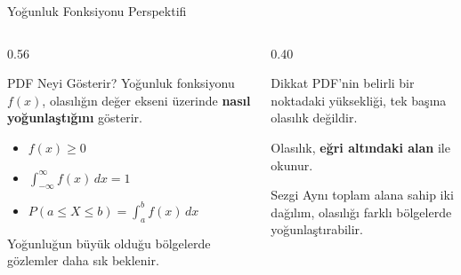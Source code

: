 \documentclass[light]{lutbeamer}
\begin{document}
\begin{frame}{Yoğunluk Fonksiyonu Perspektifi}
\small
\begin{columns}[T,onlytextwidth]
    \begin{column}{0.56\textwidth}
        \begin{block}{PDF Neyi Gösterir?}
            Yoğunluk fonksiyonu $f(x)$, olasılığın değer ekseni üzerinde \textbf{nasıl yoğunlaştığını} gösterir.
        \end{block}

        \begin{itemize}
            \item $f(x) \ge 0$
            \item $\int_{-\infty}^{\infty} f(x)\,dx = 1$
            \item $P(a \le X \le b)=\int_a^b f(x)\,dx$
        \end{itemize}

        Yoğunluğun büyük olduğu bölgelerde gözlemler daha sık beklenir.
    \end{column}
    \begin{column}{0.40\textwidth}
        \begin{alertblock}{Dikkat}
            PDF'nin belirli bir noktadaki yüksekliği, tek başına olasılık değildir.

            \vspace{0.15cm}
            Olasılık, \textbf{eğri altındaki alan} ile okunur.
        \end{alertblock}

        \begin{exampleblock}{Sezgi}
            Aynı toplam alana sahip iki dağılım, olasılığı farklı bölgelerde yoğunlaştırabilir.
        \end{exampleblock}
    \end{column}
\end{columns}
\end{frame}
\end{document}
